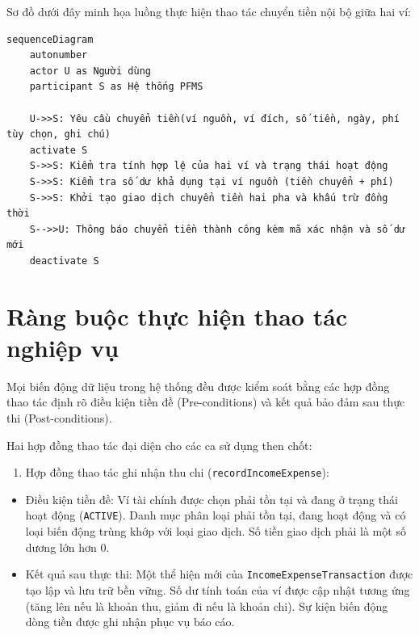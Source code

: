 \documentclass[a4paper,12pt]{report}
\providecommand{\tightlist}{%
  \setlength{\itemsep}{0pt}\setlength{\parskip}{0pt}}
\newcommand{\passthrough}[1]{#1}
\begin{document}
Sơ đồ dưới đây minh họa luồng thực hiện thao tác chuyển tiền nội bộ giữa
hai ví:

\begin{lstlisting}
sequenceDiagram
    autonumber
    actor U as Người dùng
    participant S as Hệ thống PFMS

    U->>S: Yêu cầu chuyển tiền(ví nguồn, ví đích, số tiền, ngày, phí tùy chọn, ghi chú)
    activate S
    S->>S: Kiểm tra tính hợp lệ của hai ví và trạng thái hoạt động
    S->>S: Kiểm tra số dư khả dụng tại ví nguồn (tiền chuyển + phí)
    S->>S: Khởi tạo giao dịch chuyển tiền hai pha và khấu trừ đồng thời
    S-->>U: Thông báo chuyển tiền thành công kèm mã xác nhận và số dư mới
    deactivate S
\end{lstlisting}

\section{Ràng buộc thực hiện thao tác nghiệp
vụ}\label{ruxe0ng-buux1ed9c-thux1ef1c-hiux1ec7n-thao-tuxe1c-nghiux1ec7p-vux1ee5}

Mọi biến động dữ liệu trong hệ thống đều được kiểm soát bằng các hợp
đồng thao tác định rõ điều kiện tiền đề (Pre-conditions) và kết quả bảo
đảm sau thực thi (Post-conditions).

Hai hợp đồng thao tác đại diện cho các ca sử dụng then chốt:

\begin{enumerate}
\def\labelenumi{\arabic{enumi}.}
\tightlist
\item
  Hợp đồng thao tác ghi nhận thu chi
  (\passthrough{\lstinline!recordIncomeExpense!}):
\end{enumerate}

\begin{itemize}
\tightlist
\item
  Điều kiện tiền đề: Ví tài chính được chọn phải tồn tại và đang ở trạng
  thái hoạt động (\passthrough{\lstinline!ACTIVE!}). Danh mục phân loại
  phải tồn tại, đang hoạt động và có loại biến động trùng khớp với loại
  giao dịch. Số tiền giao dịch phải là một số dương lớn hơn 0.
\item
  Kết quả sau thực thi: Một thể hiện mới của
  \passthrough{\lstinline!IncomeExpenseTransaction!} được tạo lập và lưu
  trữ bền vững. Số dư tính toán của ví được cập nhật tương ứng (tăng lên
  nếu là khoản thu, giảm đi nếu là khoản chi). Sự kiện biến động dòng
  tiền được ghi nhận phục vụ báo cáo.
\end{itemize}
\end{document}
